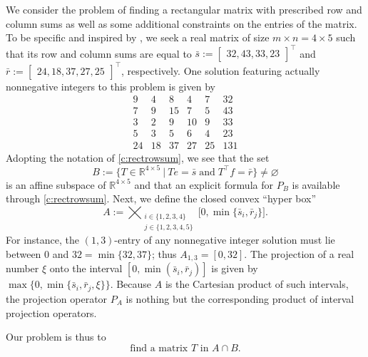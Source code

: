 \documentclass[12pt]{article}
\newcommand{\menge}[2]{\big\{{#1}~\big |~{#2}\big\}}
\newcommand{\RR}{\ensuremath{\mathbb R}}
\newcommand{\NN}{\ensuremath{\mathbb N}}
\theoremstyle{definition}
\providecommand{\RR}{\mathbb{R}}
\providecommand{\NN}{\mathbb{N}}
\providecommand{\RR}{\mathbb{R}}
\providecommand{\NN}{\mathbb{N}}
\begin{document}
{We consider the problem of finding a rectangular matrix with prescribed row and column sums as well as some 
additional constraints on the entries of the matrix. 
To be specific and inspired by \cite{stack}, 
we seek a real matrix of size $m\times n = 4\times 5$ such that its 
row and column sums are equal to 
 $\bar s:=\begin{bmatrix}32,43,33,23\end{bmatrix}^\intercal$ and 
$\bar r:=\begin{bmatrix}24,18,37,27,25\end{bmatrix}^\intercal$, 
respectively. One solution featuring actually nonnegative integers to
this problem is given by
  \[
  \begin{array}{rrrrr|r}
    9&4&8&4&7&32 \\
    7&9&15&7&5&43 \\
    3&2&9&10&9&33 \\
    5&3&5&6&4&23 \\\hline
    24&18&37&27&25&131 
  \end{array}
  \]
Adopting the notation of \cref{c:rectrowsum}, we see that the set 
\begin{equation}
B := \menge{T\in\RR^{4\times 5}}{Te =\bar{s}\;\text{and}\; T^\intercal f = \bar{r}}\neq\varnothing
\end{equation}
is an affine subspace of $\RR^{4\times 5}$ and that 
an explicit formula for $P_B$ is available through \cref{c:rectrowsum}.
Next, we define the closed convex ``hyper box''
\begin{equation}
\label{e:Aold}
A:=\bigtimes_{\substack{i\in\{1,2,3,4\}\\j\in\{1,2,3,4,5\}}}\big [0,\min\{{\bar s}_i,{\bar r}_j\}\big]. 
\end{equation} 
For instance, the $(1,3)$-entry of any nonnegative integer solution must lie between $0$ and $32=\min\{32,37\}$; thus 
$A_{1,3} = [0,32]$.
The projection of a real number $\xi$ onto the interval 
$[0,\min({\bar s}_i,{\bar r}_j)]$ is given by 
$\max\{0,\min\{{\bar s}_i,{\bar r}_j,\xi\}\}$. 
Because $A$ is the Cartesian product of such intervals, 
the projection operator $P_A$ is nothing but the corresponding
product of interval projection operators. 

Our problem is thus to 
\begin{equation}
\label{e:lastone}
\text{find a matrix $T$ in $A\cap B$.}
\end{equation}

}
\end{document}
